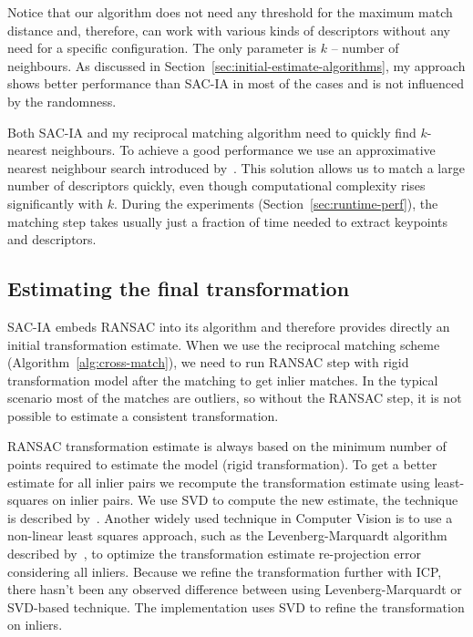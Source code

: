 Notice that our algorithm does not need any threshold for the maximum match distance and, therefore, can work with various kinds of descriptors without any need for a specific configuration. The only parameter is $k$ -- number of neighbours. As discussed in Section~\ref{sec:initial-estimate-algorithms}, my approach shows better performance than \gls{SAC-IA} in most of the cases and is not influenced by the randomness.

Both \gls{SAC-IA} and my reciprocal matching algorithm need to quickly find $k$-nearest neighbours. To achieve a good performance we use an approximative nearest neighbour search introduced by~\citet{muja2014flann}. This solution allows us to match a large number of descriptors quickly, even though computational complexity rises significantly with $k$. During the experiments (Section~\ref{sec:runtime-perf}), the matching step takes usually just a fraction of time needed to extract keypoints and descriptors.

\subsection{Estimating the final transformation}
\label{sec:final-estimation}

\gls{SAC-IA} embeds \gls{RANSAC} into its algorithm and therefore provides directly an initial transformation estimate. When we use the reciprocal matching scheme (Algorithm~\ref{alg:cross-match}), we need to run \gls{RANSAC} step with rigid transformation model after the matching to get inlier matches. In the typical scenario most of the matches are outliers, so without the \gls{RANSAC} step, it is not possible to estimate a consistent transformation.

\gls{RANSAC} transformation estimate is always based on the minimum number of points required to estimate the model (rigid transformation). To get a better estimate for all inlier pairs we recompute the transformation estimate using least-squares on inlier pairs. We use \gls{SVD} to compute the new estimate, the technique is described by~\citet{golub1970svd}. Another widely used technique in Computer Vision is to use a non-linear least squares approach, such as the Levenberg-Marquardt algorithm described by~\citet{more1978levmarq}, to optimize the transformation estimate re-projection error considering all inliers. Because we refine the transformation further with \gls{ICP}, there hasn't been any observed difference between using Levenberg-Marquardt or \gls{SVD}-based technique. The implementation uses \gls{SVD} to refine the transformation on inliers.

